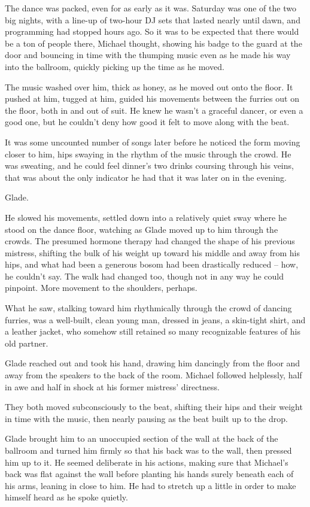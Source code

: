 The dance was packed, even for as early as it was. Saturday was one of the two big nights, with a line-up of two-hour DJ sets that lasted nearly until dawn, and programming had stopped hours ago. So it was to be expected that there would be a ton of people there, Michael thought, showing his badge to the guard at the door and bouncing in time with the thumping music even as he made his way into the ballroom, quickly picking up the time as he moved.

The music washed over him, thick as honey, as he moved out onto the floor. It pushed at him, tugged at him, guided his movements between the furries out on the floor, both in and out of suit. He knew he wasn't a graceful dancer, or even a good one, but he couldn't deny how good it felt to move along with the beat.

It was some uncounted number of songs later before he noticed the form moving closer to him, hips swaying in the rhythm of the music through the crowd. He was sweating, and he could feel dinner's two drinks coursing through his veins, that was about the only indicator he had that it was later on in the evening.

Glade.

He slowed his movements, settled down into a relatively quiet sway where he stood on the dance floor, watching as Glade moved up to him through the crowds. The presumed hormone therapy had changed the shape of his previous mistress, shifting the bulk of his weight up toward his middle and away from his hips, and what had been a generous bosom had been drastically reduced -- how, he couldn't say. The walk had changed too, though not in any way he could pinpoint. More movement to the shoulders, perhaps.

What he saw, stalking toward him rhythmically through the crowd of dancing furries, was a well-built, clean young man, dressed in jeans, a skin-tight shirt, and a leather jacket, who somehow still retained so many recognizable features of his old partner.

Glade reached out and took his hand, drawing him dancingly from the floor and away from the speakers to the back of the room. Michael followed helplessly, half in awe and half in shock at his former mistress' directness.

They both moved subconsciously to the beat, shifting their hips and their weight in time with the music, then nearly pausing as the beat built up to the drop.

Glade brought him to an unoccupied section of the wall at the back of the ballroom and turned him firmly so that his back was to the wall, then pressed him up to it. He seemed deliberate in his actions, making sure that Michael's back was flat against the wall before planting his hands surely beneath each of his arms, leaning in close to him. He had to stretch up a little in order to make himself heard as he spoke quietly.


